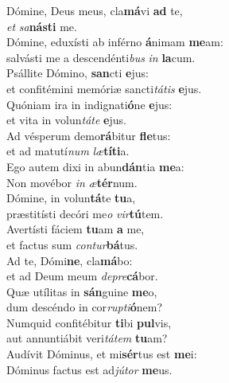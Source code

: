 \evenverse Dómine, Deus meus, cla\textbf{má}vi \textbf{ad} te,~\*\\
\evenverse \textit{et} \textit{sa}\textbf{ná}\textbf{sti} me.\\
\oddverse Dómine, eduxísti ab inférno \textbf{á}nimam \textbf{me}am:~\*\\
\oddverse salvásti me a descendénti\textit{bus} \textit{in} \textbf{la}cum.\\
\evenverse Psállite Dómino, \textbf{san}cti \textbf{e}jus:~\*\\
\evenverse et confitémini memóriæ sancti\textit{tá}\textit{tis} \textbf{e}jus.\\
\oddverse Quóniam ira in indignati\textbf{ó}ne \textbf{e}jus:~\*\\
\oddverse et vita in volun\textit{tá}\textit{te} \textbf{e}jus.\\
\evenverse Ad vésperum demo\textbf{rá}bitur \textbf{fle}tus:~\*\\
\evenverse et ad matutí\textit{num} \textit{læ}\textbf{tí}\textbf{ti}a.\\
\oddverse Ego autem dixi in abun\textbf{dán}tia \textbf{me}a:~\*\\
\oddverse Non movébor \textit{in} \textit{æ}\textbf{tér}num.\\
\evenverse Dómine, in volun\textbf{tá}te \textbf{tu}a,~\*\\
\evenverse præstitísti decóri me\textit{o} \textit{vir}\textbf{tú}tem.\\
\oddverse Avertísti fáciem \textbf{tu}am \textbf{a} me,~\*\\
\oddverse et factus sum \textit{con}\textit{tur}\textbf{bá}tus.\\
\evenverse Ad te, Dómi\textbf{ne}, cla\textbf{má}bo:~\*\\
\evenverse et ad Deum meum \textit{de}\textit{pre}\textbf{cá}bor.\\
\oddverse Quæ utílitas in \textbf{sán}guine \textbf{me}o,~\*\\
\oddverse dum descéndo in cor\textit{rup}\textit{ti}\textbf{ó}nem?\\
\evenverse Numquid confitébitur \textbf{ti}bi \textbf{pul}vis,~\*\\
\evenverse aut annuntiábit veri\textit{tá}\textit{tem} \textbf{tu}am?\\
\oddverse Audívit Dóminus, et mi\textbf{sér}tus est \textbf{me}i:~\*\\
\oddverse Dóminus factus est ad\textit{jú}\textit{tor} \textbf{me}us.\\
